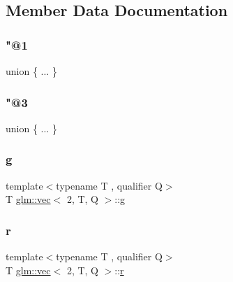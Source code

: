 \subsection{Member Data Documentation}
\mbox{\label{structglm_1_1vec_3_012_00_01_t_00_01_q_01_4_ab7e11768a87dbff4d5ac34875abe8c05}} 
\subsubsection{\texorpdfstring{"@1}{@1}}
{\footnotesize\ttfamily union \{ ... \} }

\mbox{\label{structglm_1_1vec_3_012_00_01_t_00_01_q_01_4_abe7f1c83f32575287a9bba2c2dfae5fb}} 
\subsubsection{\texorpdfstring{"@3}{@3}}
{\footnotesize\ttfamily union \{ ... \} }

\mbox{\label{structglm_1_1vec_3_012_00_01_t_00_01_q_01_4_aaf3f27aace8dfa7faee4c496738852b4}} 
\subsubsection{\texorpdfstring{g}{g}}
{\footnotesize\ttfamily template$<$typename T , qualifier Q$>$ \\
T \hyperlink{structglm_1_1vec}{glm\+::vec}$<$ 2, T, Q $>$\+::\hyperlink{_s_d_l__opengl__glext_8h_acaceb3a655ff28b75259860bcb868f9f}{g}}

\mbox{\label{structglm_1_1vec_3_012_00_01_t_00_01_q_01_4_a8a13d65214d1106eb2e6c9ce472b99d3}} 
\subsubsection{\texorpdfstring{r}{r}}
{\footnotesize\ttfamily template$<$typename T , qualifier Q$>$ \\
T \hyperlink{structglm_1_1vec}{glm\+::vec}$<$ 2, T, Q $>$\+::\hyperlink{_s_d_l__opengl_8h_a42ce7cdc612e53abee15043f80220d97}{r}}

